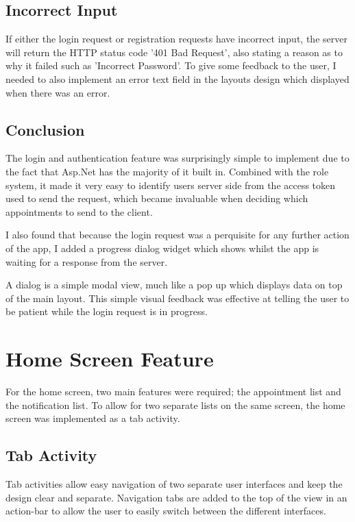 \subsection{Incorrect Input}

If either the login request or registration requests have incorrect input, the server will return the HTTP status code '401 Bad Request', also stating a reason as to why it failed such as 'Incorrect Password'. To give some feedback to the user, I needed to also implement an error text field in the layouts design which displayed when there was an error.

\subsection{Conclusion}

The login and authentication feature was surprisingly simple to implement due to the fact that Asp.Net has the majority of it built in. Combined with the role system, it made it very easy to identify users server side from the access token used to send the request, which became invaluable when deciding which appointments to send to the client.

I also found that because the login request was a perquisite for any further action of the app, I added a progress dialog widget which shows whilst the app is waiting for a response from the server. 

A dialog is a simple modal view, much like a pop up which displays data on top of the main layout. This simple visual feedback was effective at telling the user to be patient while the login request is in progress.

\section{Home Screen Feature}

For the home screen, two main features were required; the appointment list and the notification list. To allow for two separate lists on the same screen, the home screen was implemented as a tab activity.

\subsection{Tab Activity}

Tab activities allow easy navigation of two separate user interfaces and keep the design clear and separate. Navigation tabs are added to the top of the view in an action-bar to allow the user to easily switch between the different interfaces. 

